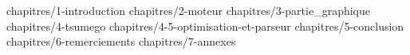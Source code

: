 \documentclass[11pt, a4paper, oneside, BCOR=10mm, french]{scrbook}
\begin{document}
    \pagestyle{empty}
    
    \hypersetup{pageanchor=false}
    
    
    
    \pagestyle{plain}
    
    \frontmatter
    \tableofcontents
    \listoffigures
    \listofalgorithms

    \hypersetup{pageanchor=true}

    \mainmatter
     {chapitres/1-introduction}
     {chapitres/2-moteur}
     {chapitres/3-partie_graphique}
     {chapitres/4-tsumego}
     {chapitres/4-5-optimisation-et-parseur}
     {chapitres/5-conclusion}
     {chapitres/6-remerciements}
     {chapitres/7-annexes}

    
\end{document}
